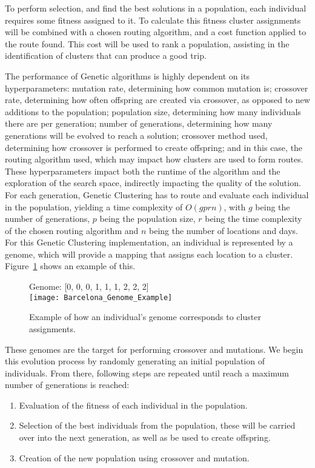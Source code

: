 To perform selection, and find the best solutions in a population, each individual requires some fitness assigned to it.
To calculate this fitness cluster assignments will be combined with a chosen routing algorithm, and a cost function
applied to the route found.
This cost will be used to rank a population, assisting in the identification of clusters that can produce a good trip.

The performance of Genetic algorithms is highly dependent on its hyperparameters: mutation rate, determining how
common mutation is; crossover rate, determining how often offspring are created via crossover, as opposed to new
additions to the population; population size, determining how many individuals there are per generation; number of
generations, determining how many generations will be evolved to reach a solution; crossover method used,
determining how crossover is performed to create offspring; and in this case, the routing algorithm used, which may
impact how clusters are used to form routes.
These hyperparameters impact both the runtime of the algorithm and the exploration of the search space, indirectly
impacting the quality of the solution.
For each generation, Genetic Clustering has to route and evaluate each individual in the population, yielding a time
complexity of $O(g p r n)$, with $g$ being the number of generations, $p$ being the population size,
$r$ being the time complexity of the chosen routing algorithm and $n$ being the number of locations and days.\\

\noindent
For this Genetic Clustering implementation, an individual is represented by a genome, which will provide a mapping
that assigns each location to a cluster.
Figure~\ref{fig:barcelona-genome-example} shows an example of this.
\begin{figure}[H]
    \centering
    Genome: [0, 0, 0, 1, 1, 1, 2, 2, 2]\\
    \texttt{[image: Barcelona\_Genome\_Example]}
    \caption{Example of how an individual's genome corresponds to cluster assignments.}
    \label{fig:barcelona-genome-example}
\end{figure}

\noindent
These genomes are the target for performing crossover and mutations.
We begin this evolution process by randomly generating an initial population of individuals.
From there, following steps are repeated until reach a maximum number of generations is reached:
\begin{enumerate}
    \item Evaluation of the fitness of each individual in the population.
    \item Selection of the best individuals from the population, these will be carried over into the next generation, as
    well as be used to create offspring.
    \item Creation of the new population using crossover and mutation.
\end{enumerate}

